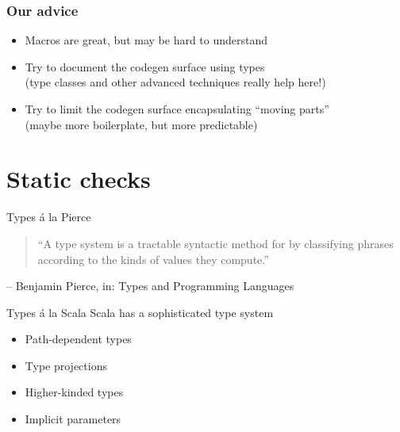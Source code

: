 \documentclass{beamer}
\begin{document}
\begin{frame}[fragile]
\frametitle{Our advice}
  \begin{itemize}
    \item Macros are great, but may be hard to understand
    \item Try to document the codegen surface using types\\
      (type classes and other advanced techniques really help here!)
    \item Try to limit the codegen surface encapsulating ``moving parts''\\
      (maybe more boilerplate, but more predictable)
  \end{itemize}
\end{frame}


  \section{Static checks}

\begin{frame}{Types \'a la Pierce}
  \begin{quote}
    ``A type system is a tractable syntactic method for  by classifying phrases according to the kinds of values they compute.''
  \end{quote}
  \hfill -- Benjamin Pierce, in: Types and Programming Languages
\end{frame}

\begin{frame}{Types \'a la Scala}
  Scala has a sophisticated type system
  \begin{itemize}
    \item Path-dependent types
    \item Type projections
    \item Higher-kinded types
    \item Implicit parameters
  \end{itemize}
\end{frame}
\end{document}

